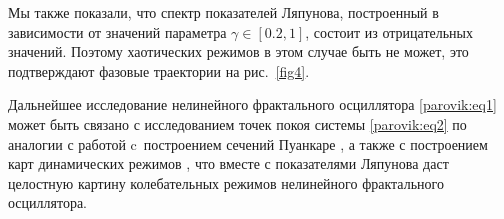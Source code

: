 Мы также показали, что спектр показателей Ляпунова, построенный в зависимости от значений параметра $\gamma  \in \left[ {0.2,1} \right]$, состоит из отрицательных значений. Поэтому хаотических режимов в этом случае быть не может, это подтверждают фазовые траектории на рис.~\ref{fig4}.



Дальнейшее исследование нелинейного фрактального осциллятора \eqref{parovik:eq1} может быть связано с исследованием точек покоя системы \eqref{parovik:eq2} по аналогии с работой \cite{parovik:21} c~построением сечений Пуанкаре \cite{parovik:22}, а также с построением карт динамических режимов \cite{parovik:23}, что вместе с показателями Ляпунова даст целостную картину колебательных режимов нелинейного фрактального осциллятора. 



\smallskip












	



